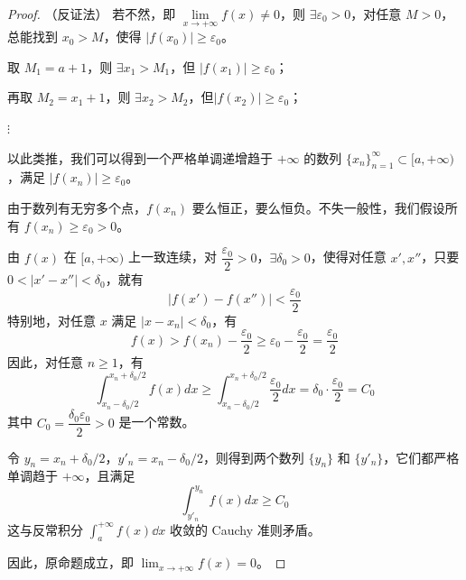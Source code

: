 \begin{proof}
	（反证法）
	若不然，即 $\lim\limits_{x\to+\infty} f(x)\neq 0$，则 $\exists \varepsilon_0>0$，对任意 $M>0$，总能找到 $x_0>M$，使得 $|f(x_0)|\ge \varepsilon_0$。
	
	取 $M_1=a+1$，则 $\exists x_1>M_1$，但 $|f(x_1)|\ge \varepsilon_0$；
	
	再取 $M_2=x_1+1$，则 $\exists x_2>M_2$，但$|f(x_2)|\ge \varepsilon_0$；
	
	$\vdots$
	
	以此类推，我们可以得到一个严格单调递增趋于 $+\infty$ 的数列 $\{x_n\}_{n=1}^\infty \subset [a,+\infty)$，满足 $|f(x_n)|\ge \varepsilon_0$。
	
	由于数列有无穷多个点，$f(x_n)$ 要么恒正，要么恒负。不失一般性，我们假设所有 $f(x_n)\ge \varepsilon_0>0$。
	
	由 $f(x)$ 在 $[a,+\infty)$ 上一致连续，对 $\dfrac{\varepsilon_0}{2}>0$，$\exists \delta_0>0$，使得对任意 $x',x''$，只要 $0<|x'-x''|<\delta_0$，就有
	\[
	|f(x')-f(x'')|<\frac{\varepsilon_0}{2}
	\]
	特别地，对任意 $x$ 满足 $|x-x_n|<\delta_0$，有
	\[
	f(x) > f(x_n) - \frac{\varepsilon_0}{2} \ge \varepsilon_0 - \frac{\varepsilon_0}{2} = \frac{\varepsilon_0}{2}
	\]
	因此，对任意 $n\ge 1$，有
	\[
	\int_{x_n-\delta_0/2}^{x_n+\delta_0/2} f(x)dx \ge \int_{x_n-\delta_0/2}^{x_n+\delta_0/2} \frac{\varepsilon_0}{2} dx = \delta_0 \cdot \frac{\varepsilon_0}{2} = C_0
	\]
	其中 $C_0=\dfrac{\delta_0\varepsilon_0}{2}>0$ 是一个常数。
	
	令 $y_n=x_n+\delta_0/2$，$y'_n=x_n-\delta_0/2$，则得到两个数列 $\{y_n\}$ 和 $\{y'_n\}$，它们都严格单调趋于 $+\infty$，且满足
	\[
	\int_{y'_n}^{y_n} f(x)dx \ge C_0
	\]
	这与反常积分 $\displaystyle \int_a^{+\infty} f(x)\dd x$ 收敛的 Cauchy 准则矛盾。
	
	因此，原命题成立，即 $\displaystyle \lim_{x\to+\infty} f(x)=0$。
	
	
\end{proof}
